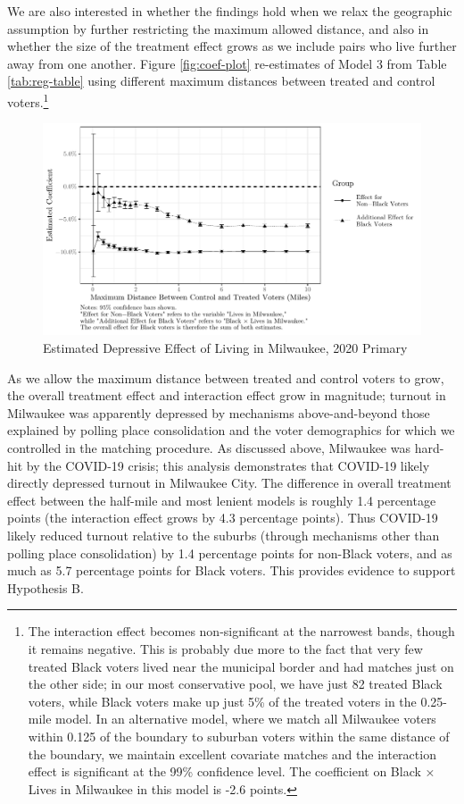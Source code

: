 \documentclass[
  12pt,
]{article}
\begin{document}
We are also interested in whether the findings hold when we relax the geographic assumption by further restricting the maximum allowed distance, and also in whether the size of the treatment effect grows as we include pairs who live further away from one another. Figure \ref{fig:coef-plot} re-estimates of Model 3 from Table \ref{tab:reg-table} using different maximum distances between treated and control voters.\footnote{The interaction effect becomes non-significant at the narrowest bands, though it remains negative. This is probably due more to the fact that very few treated Black voters lived near the municipal border and had matches just on the other side; in our most conservative pool, we have just 82 treated Black voters, while Black voters make up just 5\% of the treated voters in the 0.25-mile model. In an alternative model, where we match all Milwaukee voters within 0.125 of the boundary to suburban voters within the same distance of the boundary, we maintain excellent covariate matches and the interaction effect is significant at the 99\% confidence level. The coefficient on Black × Lives in Milwaukee in this model is -2.6 points.}

\begin{figure}[H]

{\centering \includegraphics{mke_turnout_files/figure-latex/plot-1} 

}

\caption{\label{fig:coef-plot}Estimated Depressive Effect of Living in Milwaukee, 2020 Primary}\label{fig:plot}
\end{figure}

As we allow the maximum distance between treated and control voters to grow, the overall treatment effect and interaction effect grow in magnitude; turnout in Milwaukee was apparently depressed by mechanisms above-and-beyond those explained by polling place consolidation and the voter demographics for which we controlled in the matching procedure. As discussed above, Milwaukee was hard-hit by the COVID-19 crisis; this analysis demonstrates that COVID-19 likely directly depressed turnout in Milwaukee City. The difference in overall treatment effect between the half-mile and most lenient models is roughly 1.4 percentage points (the interaction effect grows by 4.3 percentage points). Thus COVID-19 likely reduced turnout relative to the suburbs (through mechanisms other than polling place consolidation) by 1.4 percentage points for non-Black voters, and as much as 5.7 percentage points for Black voters. This provides evidence to support Hypothesis B.
\end{document}
